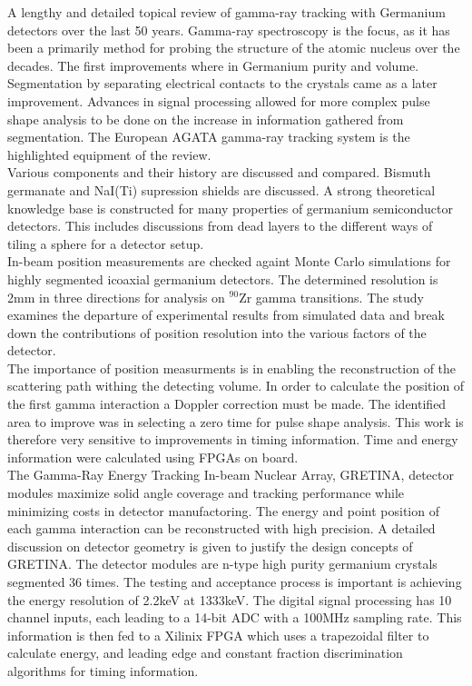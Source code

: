 \documentclass[12pt]{article}
\begin{document}
A lengthy and detailed topical review of gamma-ray tracking with Germanium detectors over the last 50 years. Gamma-ray spectroscopy is the focus, as it has been a primarily method for probing the structure of the atomic nucleus over the decades. The first improvements where in Germanium purity and volume. Segmentation by separating electrical contacts to the crystals came as a later improvement. Advances in signal processing allowed for more complex pulse shape analysis to be done on the increase in information gathered from segmentation. The European AGATA gamma-ray tracking system is the highlighted equipment of the review.
\\
Various components and their history are discussed and compared. Bismuth germanate and NaI(Ti) supression shields are discussed. A strong theoretical knowledge base is constructed for many properties of germanium semiconductor detectors. This includes discussions from dead layers to the different ways of tiling a sphere for a detector setup.
\\[20pt]


{\large\textbf{\cite{Descovich2005535}}}
In-beam position measurements are checked againt Monte Carlo simulations for highly segmented icoaxial germanium detectors. The determined resolution is 2mm in three directions for analysis on $^{90}\mbox{Zr}$ gamma transitions. The study examines the departure of experimental results from simulated data and break down the contributions of position resolution into the various factors of the detector.
\\
The importance of position measurments is in enabling the reconstruction of the scattering path withing the detecting volume. In order to calculate the position of the first gamma interaction a Doppler correction must be made. The identified area to improve was in selecting a zero time for pulse shape analysis. This work is therefore very sensitive to improvements in timing information. Time and energy information were calculated using FPGAs on board.
\\[20pt]


{\large\textbf{\cite{Paschalis201344}}}
The Gamma-Ray Energy Tracking In-beam Nuclear Array, GRETINA, detector modules maximize solid angle coverage and tracking performance while minimizing costs in detector manufactoring. The energy and point position of each gamma interaction can be reconstructed with high precision. A detailed discussion on detector geometry is given to justify the design concepts of GRETINA. The detector modules are n-type high purity germanium crystals segmented 36 times. The testing and acceptance process is important is achieving the energy resolution of 2.2keV at 1333keV. The digital signal processing has 10 channel inputs, each leading to a 14-bit ADC with a 100MHz sampling rate. This information is then fed to a Xilinix FPGA which uses a trapezoidal filter to calculate energy, and leading edge and constant fraction discrimination algorithms for timing information.
\\[20pt]
\end{document}

